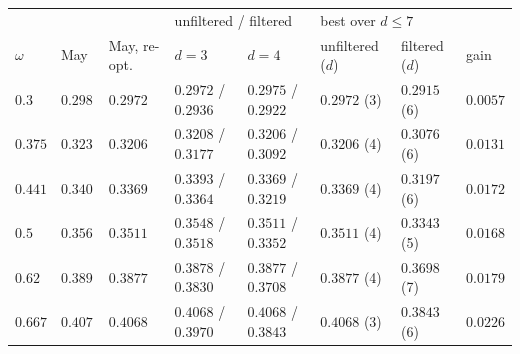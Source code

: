 \begin{tabular}{llllllll}
\toprule
 & & & \multicolumn{2}{l}{unfiltered / filtered} & \multicolumn{2}{l}{best over $d\le7$} & \\
$\omega$ & May~\cite{May21} & May, re-opt. & $d=3$ & $d=4$ & unfiltered ($d$) & filtered ($d$) & gain \\
\midrule
$0.3$ & $0.298$ & $0.2972$ & $0.2972$ / $0.2936$ & $0.2975$ / $0.2922$ & $0.2972$ (3) & $0.2915$ (6) & $0.0057$ \\
$0.375$ & $0.323$ & $0.3206$ & $0.3208$ / $0.3177$ & $0.3206$ / $0.3092$ & $0.3206$ (4) & $0.3076$ (6) & $0.0131$ \\
$0.441$ & $0.340$ & $0.3369$ & $0.3393$ / $0.3364$ & $0.3369$ / $0.3219$ & $0.3369$ (4) & $0.3197$ (6) & $0.0172$ \\
$0.5$ & $0.356$ & $0.3511$ & $0.3548$ / $0.3518$ & $0.3511$ / $0.3352$ & $0.3511$ (4) & $0.3343$ (5) & $0.0168$ \\
$0.62$ & $0.389$ & $0.3877$ & $0.3878$ / $0.3830$ & $0.3877$ / $0.3708$ & $0.3877$ (4) & $0.3698$ (7) & $0.0179$ \\
$0.667$ & $0.407$ & $0.4068$ & $0.4068$ / $0.3970$ & $0.4068$ / $0.3843$ & $0.4068$ (3) & $0.3843$ (6) & $0.0226$ \\
\bottomrule
\end{tabular}
